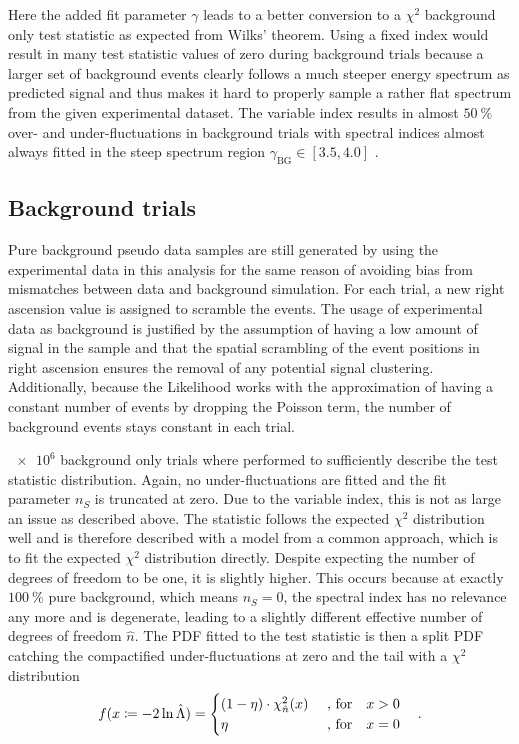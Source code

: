Here the added fit parameter $\gamma$ leads to a better conversion to a $\chi^2$ background only test statistic as expected from Wilks' theorem.
Using a fixed index would result in many test statistic values of zero during background trials because a larger set of background events clearly follows a much steeper energy spectrum as predicted signal and thus makes it hard to properly sample a rather flat spectrum from the given experimental dataset.
The variable index results in almost $\SI{50}{\percent}$ over- and under-fluctuations in background trials with spectral indices almost always fitted in the steep spectrum region $\gamma_\text{BG}\in[3.5, 4.0]$ .

\subsection*{Background trials}
Pure background pseudo data samples are still generated by using the experimental data in this analysis for the same reason of avoiding bias from mismatches between data and background simulation.
For each trial, a new right ascension value is assigned to scramble the events.
The usage of experimental data as background is justified by the assumption of having a low amount of signal in the sample and that the spatial scrambling of the event positions in right ascension ensures the removal of any potential signal clustering.
Additionally, because the Likelihood works with the approximation of having a constant number of events by dropping the Poisson term, the number of background events stays constant in each trial.

$\num{e6}$ background only trials where performed to sufficiently describe the test statistic distribution.
Again, no under-fluctuations are fitted and the fit parameter $n_S$ is truncated at zero.
Due to the variable index, this is not as large an issue as described above.
The statistic follows the expected $\chi^2$ distribution well and is therefore described with a model from a common approach, which is to fit the expected $\chi^2$ distribution directly.
Despite expecting the number of degrees of freedom to be one, it is slightly higher.
This occurs because at exactly $\SI{100}{\percent}$ pure background, which means $n_S=0$, the spectral index has no relevance any more and is degenerate, leading to a slightly different effective number of degrees of freedom $\hat{n}$.
The PDF fitted to the test statistic is then a split PDF catching the compactified under-fluctuations at zero and the tail with a $\chi^2$ distribution 
\begin{equation}
  f(x \coloneqq -2\ln\hat{\Lambda}) =
  \begin{cases}
    (1 - \eta) \cdot \chi^2_{\hat{n}}(x) &\text{ , for}\quad x > 0 \\
    \eta &\text{ , for}\quad x = 0
  \end{cases}
  \quad\text{.}
\end{equation}

